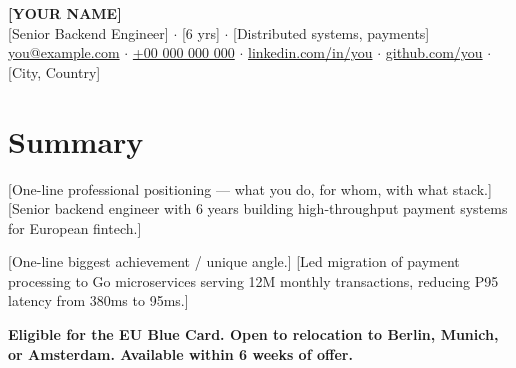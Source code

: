 \documentclass[a4paper,11pt]{article}
\begin{document}
\pagestyle{empty}

%

\begin{center}
  {\Huge\bfseries [YOUR NAME]} \\[3pt]
  {\large [Senior Backend Engineer] $\cdot$ [6 yrs] $\cdot$ [Distributed systems, payments]} \\[3pt]
  \small
  \href{mailto:you@example.com}{you@example.com}
  $\cdot$ \href{tel:+0000000000}{+00 000 000 000}
  $\cdot$ \href{https://linkedin.com/in/you}{linkedin.com/in/you}
  $\cdot$ \href{https://github.com/you}{github.com/you}
  $\cdot$ [City, Country]
\end{center}

\vspace{-4pt}


\section*{Summary}

[One-line professional positioning — what you do, for whom, with what stack.] [Senior backend engineer with 6 years building high-throughput payment systems for European fintech.]

[One-line biggest achievement / unique angle.] [Led migration of payment processing to Go microservices serving 12M monthly transactions, reducing P95 latency from 380ms to 95ms.]

\textbf{Eligible for the EU Blue Card. Open to relocation to Berlin, Munich, or Amsterdam. Available within 6 weeks of offer.}

%
%
\end{document}
